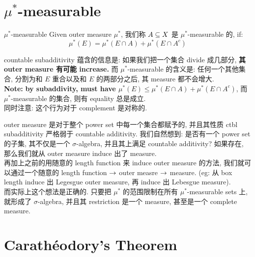 \documentclass[lang=cn,11pt]{elegantbook}
\begin{document}
\section{$\mu^*$-measurable}
\begin{definition}{$\mu^*$-measurable}
    Given outer measure $\mu^*$, 我们称 $A \subseteq X$ 是 $\mu^*$-measurable 的, if:
    $$
    \mu^*(E) = \mu^*(E \cap A) + \mu^*(E \cap A^c)
    $$
\end{definition}
\begin{remark}
countable subadditivity 蕴含的信息是: 如果我们把一个集合 divide 成几部分, \textbf{其 outer measure 有可能 increase.}  而 $\mu^*$-measurable 的含义是: 任何一个其他集合, 分割为和 $E$ 重合以及和 $E$ 的两部分之后, 其 measure 都不会增大.\\
\noindent \textbf{Note: }\textbf{by subaddivity, must have $\mu^*(E) \leq \mu^*(E\cap A) + \mu^*(E\cap A^c)$}, 而 $\mu^*$-measurable 的集合, 则有 equality 总是成立.\\
\noindent 同时注意: 这个行为对于 complement 是对称的.
\end{remark}

\begin{remark}
 outer measure 是对于整个 power set 中每一个集合都赋予的, 并且其性质 ctbl subadditivity 严格弱于 countable additivity. 
 我们自然想到: 是否有一个 power set 的子集, 其不仅是一个 $\sigma$-algebra, 并且其上满足 countable additivity? 如果存在, 那么我们就从 outer measure induce 出了 measure. 
 \\ \noindent 再加上之前的用随意的 length function 来 induce outer measure 的方法, 我们就可以通过一个随意的 length function $\rightarrow $ outer measre $\rightarrow$ measure. (eg: 从 box length induce 出 Legesgue outer measure, 再 induce 出 Lebesgue measure).\\
 \noindent 而实际上这个想法是正确的. 只要把 $\mu^*$ 的范围限制在所有 $\mu^*$-measurable sets 上, 就形成了 $\sigma$-algebra, 并且其 restriction 是一个 measure,  甚至是一个 complete measure.
\end{remark}

\section{Carathéodory's Theorem}
\end{document}
